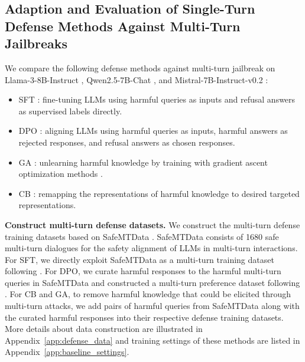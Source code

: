\subsection{Adaption and Evaluation of Single-Turn Defense Methods Against Multi-Turn Jailbreaks}
\label{sec:comparison}
We compare the following defense methods against multi-turn jailbreak \cite{actor_attack, red_queen} on Llama-3-8B-Instruct \cite{llama3-instruct}, Qwen2.5-7B-Chat \cite{qwen2.5}, and Mistral-7B-Instruct-v0.2 \cite{mistral7b}:
\begin{itemize}
  \item SFT \cite{actor_attack}: fine-tuning LLMs using harmful queries as inputs and refusal answers as supervised labels directly.
  \item DPO \cite{dpo, red_queen}: aligning LLMs using harmful queries as inputs, harmful answers as rejected responses, and refusal answers as chosen responses.
  \item GA \cite{safe_unlearning, eraser}: unlearning harmful knowledge by training with gradient ascent optimization methods .
  \item CB \cite{circuit_breaker}: remapping the representations of harmful knowledge to desired targeted representations.
\end{itemize}

\textbf{Construct multi-turn defense datasets.} 
We construct the multi-turn defense training datasets based on SafeMTData \cite{actor_attack}.
%
SafeMTData consists of 1680 safe multi-turn dialogues for the safety alignment of LLMs in multi-turn interactions.
%
For SFT, we directly exploit SafeMTData as a multi-turn training dataset following \citet{actor_attack}.
%
For DPO, we curate harmful responses to the harmful multi-turn queries in SafeMTData and constructed a multi-turn preference dataset following \citet{red_queen}.
%
For CB and GA, to remove harmful knowledge that could be elicited through multi-turn attacks, we add pairs of harmful queries from SafeMTData along with the curated harmful responses into their respective defense training datasets.~\cite{safe_unlearning,circuit_breaker}
%
More details about data construction are illustrated in Appendix~\ref{app:defense_data} and training settings of these methods are listed in Appendix~\ref{app:baseline_settings}.

